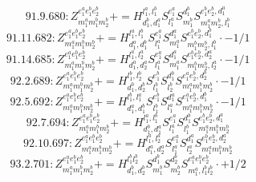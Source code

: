 \documentclass[letterpaper,10pt,fleqn,leqno,onecolumn]{article}
\begin{document}
\begin{equation} \;\;\;\;\;\;  91.9.680: Z^{e_{1}^{a}e_{1}^{b}e_{2}^{b}}_{m_{1}^{a}m_{1}^{b}m_{2}^{b}}+=H^{l_{1}^{a},l_{1}^{b}}_{d_{1}^{b},d_{1}^{a}}S^{e_{1}^{a}}_{l_{1}^{a}}S^{d_{1}^{b}}_{m_{1}^{b}}S^{e_{1}^{b}e_{2}^{b},d_{1}^{a}}_{m_{1}^{a}m_{2}^{b},l_{1}^{b}} \end{equation}
\begin{equation} \;\;\;\;\;\;  91.11.682: Z^{e_{1}^{a}e_{1}^{b}e_{2}^{b}}_{m_{1}^{a}m_{1}^{b}m_{2}^{b}}+=H^{l_{1}^{a},l_{1}^{b}}_{d_{1}^{a},d_{1}^{b}}S^{e_{1}^{a}}_{l_{1}^{a}}S^{d_{1}^{a}}_{m_{1}^{a}}S^{e_{1}^{b}e_{2}^{b},d_{1}^{b}}_{m_{1}^{b}m_{2}^{b},l_{1}^{b}}\cdot -1/1 \end{equation}
\begin{equation} \;\;\;\;\;\;  91.14.685: Z^{e_{1}^{a}e_{1}^{b}e_{2}^{b}}_{m_{1}^{a}m_{1}^{b}m_{2}^{b}}+=H^{l_{1}^{a},l_{2}^{a}}_{d_{1}^{a},d_{2}^{a}}S^{e_{1}^{a}}_{l_{1}^{a}}S^{d_{1}^{a}}_{m_{1}^{a}}S^{e_{1}^{b}e_{2}^{b},d_{2}^{a}}_{m_{1}^{b}m_{2}^{b},l_{2}^{a}}\cdot -1/1 \end{equation}
\begin{equation} \;\;\;\;\;\;  92.2.689: Z^{e_{1}^{a}e_{1}^{b}e_{2}^{b}}_{m_{1}^{a}m_{1}^{b}m_{2}^{b}}+=H^{l_{1}^{b},l_{2}^{b}}_{d_{1}^{b},d_{2}^{b}}S^{e_{1}^{b}}_{l_{1}^{b}}S^{d_{1}^{b}}_{l_{2}^{b}}S^{e_{1}^{a}e_{2}^{b},d_{2}^{b}}_{m_{1}^{a}m_{1}^{b}m_{2}^{b}}\cdot -1/1 \end{equation}
\begin{equation} \;\;\;\;\;\;  92.5.692: Z^{e_{1}^{a}e_{1}^{b}e_{2}^{b}}_{m_{1}^{a}m_{1}^{b}m_{2}^{b}}+=H^{l_{1}^{b},l_{1}^{a}}_{d_{1}^{a},d_{1}^{b}}S^{e_{1}^{b}}_{l_{1}^{b}}S^{d_{1}^{a}}_{l_{1}^{a}}S^{e_{1}^{a}e_{2}^{b},d_{1}^{b}}_{m_{1}^{a}m_{1}^{b}m_{2}^{b}}\cdot -1/1 \end{equation}
\begin{equation} \;\;\;\;\;\;  92.7.694: Z^{e_{1}^{a}e_{1}^{b}e_{2}^{b}}_{m_{1}^{a}m_{1}^{b}m_{2}^{b}}+=H^{l_{1}^{a},l_{1}^{b}}_{d_{1}^{b},d_{1}^{a}}S^{e_{1}^{a}}_{l_{1}^{a}}S^{d_{1}^{b}}_{l_{1}^{b}}S^{e_{1}^{b}e_{2}^{b},d_{1}^{a}}_{m_{1}^{a}m_{1}^{b}m_{2}^{b}} \end{equation}
\begin{equation} \;\;\;\;\;\;  92.10.697: Z^{e_{1}^{a}e_{1}^{b}e_{2}^{b}}_{m_{1}^{a}m_{1}^{b}m_{2}^{b}}+=H^{l_{1}^{a},l_{2}^{a}}_{d_{1}^{a},d_{2}^{a}}S^{e_{1}^{a}}_{l_{1}^{a}}S^{d_{1}^{a}}_{l_{2}^{a}}S^{e_{1}^{b}e_{2}^{b},d_{2}^{a}}_{m_{1}^{a}m_{1}^{b}m_{2}^{b}} \end{equation}
\begin{equation} \;\;\;\;\;\;  93.2.701: Z^{e_{1}^{a}e_{1}^{b}e_{2}^{b}}_{m_{1}^{a}m_{1}^{b}m_{2}^{b}}+=H^{l_{1}^{b}l_{2}^{b}}_{d_{1}^{b},d_{2}^{b}}S^{d_{1}^{b}}_{m_{1}^{b}}S^{d_{2}^{b}}_{m_{2}^{b}}S^{e_{1}^{a}e_{1}^{b}e_{2}^{b}}_{m_{1}^{a},l_{1}^{b}l_{2}^{b}}\cdot +1/2 \end{equation}
\end{document}
